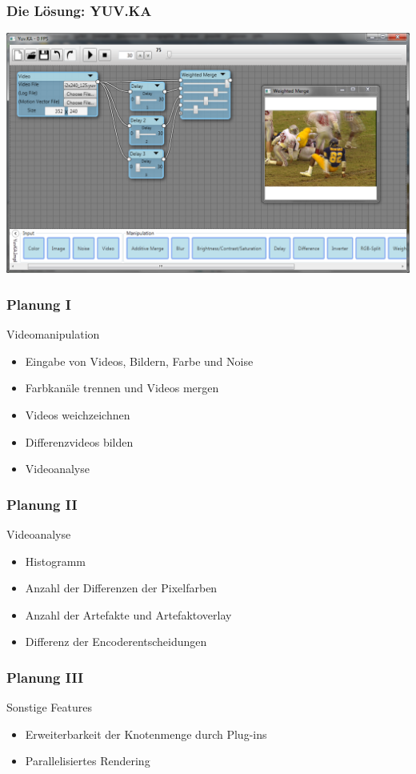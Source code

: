 \documentclass[t]{beamer}
\begin{document}
\begin{frame}
	\frametitle{Die Lösung: YUV.KA}
	\begin{center}
		\includegraphics[height=.9\textheight]{startup_screenshot.png}
	\end{center}
\end{frame}

\begin{frame}
	\frametitle{Planung I}
	Videomanipulation ~\\
	\begin{itemize}
		\item<+-> Eingabe von Videos, Bildern, Farbe und Noise
		\item<+-> Farbkanäle trennen und Videos mergen
		\item<+-> Videos weichzeichnen
		\item<+-> Differenzvideos bilden
		\item<+-> Videoanalyse
	\end{itemize}
\end{frame}

\begin{frame}
	\frametitle{Planung II}
	
	Videoanalyse ~\\
	\begin{itemize}
		\item<+-> Histogramm
		\item<+-> Anzahl der Differenzen der Pixelfarben
		\item<+-> Anzahl der Artefakte und Artefaktoverlay
		\item<+-> Differenz der Encoderentscheidungen
	\end{itemize}
\end{frame}

\begin{frame}
	\frametitle{Planung III}
	
	Sonstige Features ~\\
	\begin{itemize}
		\item<+-> Erweiterbarkeit der Knotenmenge durch Plug-ins
		\item<+-> Parallelisiertes Rendering
	\end{itemize}
\end{frame}
\end{document}
